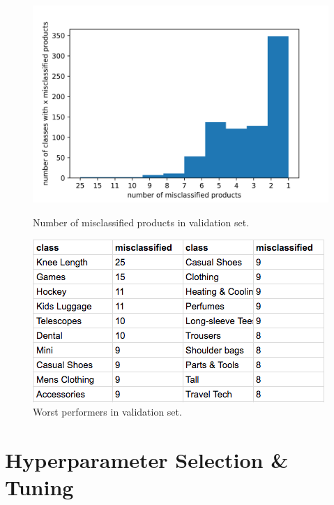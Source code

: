 \begin{figure}
\centering
\begin{minipage}{.48\textwidth}
  \centering
  \includegraphics[width=\linewidth]{figures/multiobj/misclassification_rates}
  \caption{Number of misclassified products in validation set.}
  \label{misclassification_rates}
\end{minipage}%
\begin{minipage}{.48\textwidth}
  \centering
  \includegraphics[width=\linewidth]{figures/multiobj/misclassified_top}
  \caption{Worst performers in validation set.}
  \label{misclassified_top}
\end{minipage}
\end{figure}


\section{Hyperparameter Selection \& Tuning}
\label{tuning}

